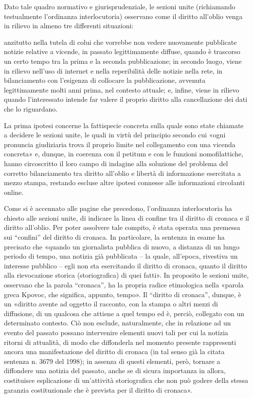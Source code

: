 Dato tale quadro normativo e giurisprudenziale, le sezioni unite (richiamando testualmente l’ordinanza interlocutoria) osservano come il diritto all’oblio venga in rilievo in almeno tre differenti situazioni:

anzitutto nella tutela di colui che vorrebbe non vedere nuovamente pubblicate notizie relative a vicende, in passato legittimamente diffuse, quando è trascorso un certo tempo tra la prima e la seconda pubblicazione;
in secondo luogo, viene in rilievo nell’uso di internet e nella reperibilità delle notizie nella rete, in bilanciamento con l’esigenza di collocare la pubblicazione, avvenuta legittimamente molti anni prima, nel contesto attuale;
e, infine, viene in rilievo quando l’interessato intende far valere il proprio diritto alla cancellazione dei dati che lo riguardano.

La prima ipotesi concerne la fattispecie concreta sulla quale sono state chiamate a decidere le sezioni unite, le quali in virtù del principio secondo cui «ogni pronuncia giudiziaria trova il proprio limite nel collegamento con una vicenda concreta» e, dunque, in coerenza con il petitum e con le funzioni nomofilattiche, hanno circoscritto il loro campo di indagine alla soluzione del problema del corretto bilanciamento tra diritto all’oblio e libertà di informazione esercitata a mezzo stampa, restando escluse altre ipotesi connesse alle informazioni circolanti online.

Come si è accennato alle pagine che precedono, l’ordinanza interlocutoria ha chiesto alle sezioni unite, di indicare la linea di confine tra il diritto di cronaca e il diritto all’oblio. Per poter assolvere tale compito, è stata operata una premessa sui “confini” del diritto di cronaca. In particolare, la sentenza in esame ha precisato che «quando un giornalista pubblica di nuovo, a distanza di un lungo periodo di tempo, una notizia già pubblicata – la quale, all’epoca, rivestiva un interesse pubblico – egli non sta esercitando il diritto di cronaca, quanto il diritto alla rievocazione storica (storiografica) di quei fatti». In proposito le sezioni unite, osservano che la parola “cronaca”, ha la propria radice etimologica nella «parola greca Kpovoc, che significa, appunto, tempo». Il “diritto di cronaca”, dunque, è un «diritto avente ad oggetto il racconto, con la stampa o altri mezzi di diffusione, di un qualcosa che attiene a quel tempo ed è, perciò, collegato con un determinato contesto. Ciò non esclude, naturalmente, che in relazione ad un evento del passato possano intervenire elementi nuovi tali per cui la notizia ritorni di attualità, di modo che diffonderla nel momento presente rappresenti ancora una manifestazione del diritto di cronaca (in tal senso già la citata sentenza n. 3679 del 1998); in assenza di questi elementi, però, tornare a diffondere una notizia del passato, anche se di sicura importanza in allora, costituisce esplicazione di un’attività storiografica che non può godere della stessa garanzia costituzionale che è prevista per il diritto di cronaca».

